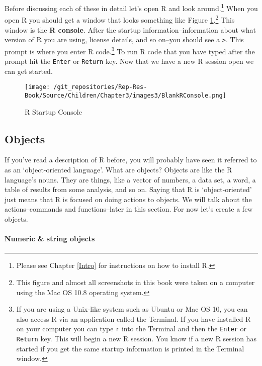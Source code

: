 Before discussing each of these in detail let's open R and look around.\footnote{Please see Chapter \ref{Intro} for instructions on how to install R.} When you open R you should get a window that looks something like Figure \ref{RBlankMain}.\footnote{This figure and almost all screenshots in this book were taken on a computer using the Mac OS 10.8 operating system.} This window is the {\bf{R console}}. After the startup information--information about what version of R you are using, license details, and so on--you should see a {\tt{\textgreater}}. This prompt is where you enter R code.\footnote{If you are using a Unix-like system such as Ubuntu or Mac OS 10, you can also access R via an application called the Terminal. If you have installed R on your computer you can type {\tt{r}} into the Terminal and then the {\tt{Enter}} or {\tt{Return}} key. This will begin a new R session. You know if a new R session has started if you get the same startup information is printed in the Terminal window.} To run R code that you have typed after the prompt hit the {\tt{Enter}} or {\tt{Return}} key. Now that we have a new R session open we can get started. 

\begin{figure}[th!]
    \caption{R Startup Console}
    \label{RBlankMain}
    \begin{center}
    \texttt{[image: /git\_repositories/Rep-Res-Book/Source/Children/Chapter3/images3/BlankRConsole.png]}
    \end{center}
\end{figure}

\subsection{Objects}\label{Objects}

If you've read a description of R before, you will probably have seen it referred to as an `object-oriented language'.  What are objects? Objects are like the R language's nouns. They are things, like a vector of numbers, a data set, a word, a table of results from some analysis, and so on. Saying that R is `object-oriented' just means that R is focused on doing actions to objects. We will talk about the actions--commands and functions--later in this section. For now let's create a few objects.

\paragraph{Numeric \& string objects}

